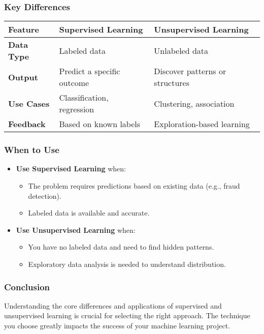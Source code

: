 \documentclass[aspectratio=169]{beamer}
\begin{document}
\begin{frame}[fragile]
    \frametitle{Key Differences}
    \begin{tabular}{|l|l|l|}
        \hline
        \textbf{Feature} & \textbf{Supervised Learning} & \textbf{Unsupervised Learning} \\
        \hline
        \textbf{Data Type} & Labeled data & Unlabeled data \\
        \hline
        \textbf{Output} & Predict a specific outcome & Discover patterns or structures \\
        \hline
        \textbf{Use Cases} & Classification, regression & Clustering, association \\
        \hline
        \textbf{Feedback} & Based on known labels & Exploration-based learning \\
        \hline
    \end{tabular}
\end{frame}

\begin{frame}[fragile]
    \frametitle{When to Use}
    \begin{itemize}
        \item \textbf{Use Supervised Learning} when:
            \begin{itemize}
                \item The problem requires predictions based on existing data (e.g., fraud detection).
                \item Labeled data is available and accurate.
            \end{itemize}
        \item \textbf{Use Unsupervised Learning} when:
            \begin{itemize}
                \item You have no labeled data and need to find hidden patterns.
                \item Exploratory data analysis is needed to understand distribution.
            \end{itemize}
    \end{itemize}
\end{frame}

\begin{frame}[fragile]
    \frametitle{Conclusion}
    Understanding the core differences and applications of supervised and unsupervised learning is crucial for selecting the right approach. The technique you choose greatly impacts the success of your machine learning project.
\end{frame}
\end{document}
